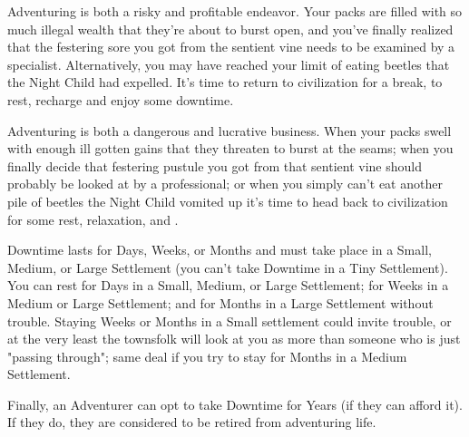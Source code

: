 
Adventuring is both a risky and profitable endeavor. Your packs are filled with so much illegal wealth that they're about to burst open, and you've finally realized that the festering sore you got from the sentient vine needs to be examined by a specialist. Alternatively, you may have reached your limit of eating beetles that the Night Child had expelled. It's time to return to civilization for a break, to rest, recharge and enjoy some downtime.

Adventuring is both a dangerous and lucrative business. When your packs swell with enough ill gotten gains that they threaten to burst at the seams; when you finally decide that festering pustule you got from that sentient vine should probably be looked at by a professional; or when you simply can't eat another pile of beetles the Night Child vomited up it's time to head back to civilization for some rest, relaxation, and .

Downtime lasts for Days, Weeks, or Months and must take place in a Small, Medium, or Large Settlement (you can't take Downtime in a Tiny Settlement). You can rest for Days in a Small, Medium, or Large Settlement; for Weeks in a Medium or Large Settlement; and for Months in a Large Settlement without trouble. Staying Weeks or Months in a Small settlement could invite trouble, or at the very least the townsfolk will look at you as more than someone who is just "passing through"; same deal if you try to stay for Months in a Medium Settlement. 

Finally, an Adventurer can opt to take Downtime for Years (if they can afford it). If they do, they are considered to be retired from adventuring life.



